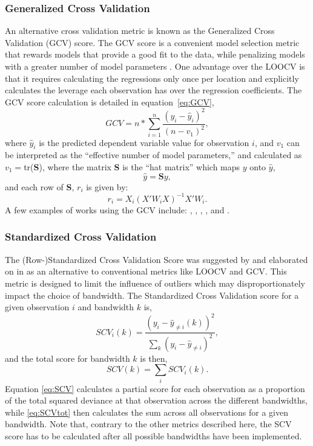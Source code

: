 \documentclass{article}\usepackage[]{graphicx}\usepackage[]{color}
\begin{document}
\subsubsection{Generalized Cross Validation}
An alternative cross validation metric is known as the Generalized Cross Validation (GCV) score. The GCV score is a convenient model selection metric that rewards models that provide a good fit to the data, while penalizing models with a greater number of model parameters \citep{Loader1999, McMillen2010}.  One advantage over the LOOCV is that it requires calculating the regressions only once per location and explicitly calculates the leverage each observation has over the regression coefficients. The GCV score calculation is detailed in equation~\eqref{eq:GCV},
\begin{equation}\label{eq:GCV}
GCV = n*\sum_{i=1}^{n}\frac{(y_i-\hat{y}_i)^2}{(n-v_1)^2}, 
\end{equation} 
where $\hat{y}_i$ is the predicted dependent variable value for observation $i$, and $v_1$ can be interpreted as the ``effective number of model parameters,'' and calculated as $v_1=$tr(\textbf{S}), where the matrix \textbf{S} is the ``hat matrix'' which maps $y$ onto $\hat{y}$,
                   \begin{equation}
                   \hat{y}=\textbf{S}y,
                   \end{equation}
                   and each row of \textbf{S}, $r_i$ is given by:
                  \begin{equation}
                   r_i=X_i(X'W_iX)^{-1}X'W_i.
                   \end{equation}
A few examples of works using the GCV include: \citet{McMillen2010}, \citet{Sunding2010}, \citet{Paez2011}, \citet{Geniaux2011}, and \citet{McMillen2012}.

\subsubsection{Standardized Cross Validation}
The (Row-)Standardized Cross Validation Score was suggested by \citep{Farber2007b} and elaborated on in \citep{Paez2011} as an alternative to conventional metrics like LOOCV and GCV. This metric is designed to limit the influence of outliers which may disproportionately impact the choice of bandwidth. The Standardized Cross Validation score for a given observation $i$ and bandwidth $k$ is, 
\begin{equation}\label{eq:SCV}
SCV_i (k) = \frac{(y_i - \hat{y}_{\neq i}(k))^2} {\sum _k (y_i - \hat{y}_{\neq i})^2 },
\end{equation}
and the total score for bandwidth $k$ is then,
\begin{equation}\label{eq:SCVtot}
SCV(k) = \sum _i SCV_i(k).
\end{equation}
Equation \eqref{eq:SCV} calculates a partial score for each observation as a proportion of the total squared deviance at that observation across the different bandwidths, while \eqref{eq:SCVtot} then calculates the sum across all observations for a given bandwidth. Note that, contrary to the other metrics described here, the SCV score has to be calculated after all possible bandwidths have been implemented.
\end{document}
